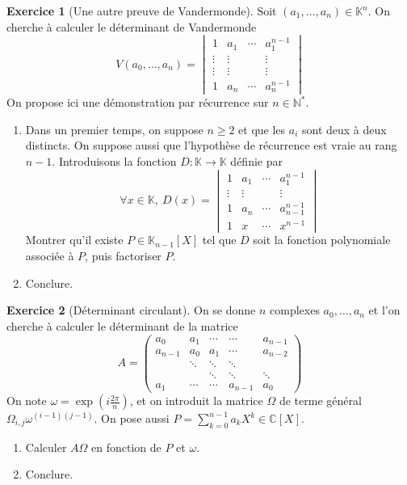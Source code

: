 \documentclass[french]{book}
\newcommand{\N}{\mathbb{N}}
\newcommand{\C}{\mathbb{C}}
\newcommand{\K}{\mathbb{K}}
\newcommand{\st}{^*}
\theoremstyle{definition}
\newtheorem{ex}{Exercice}[chapter]
\theoremstyle{theorem}
\theoremstyle{remark}
\begin{document}
\begin{ex}[Une autre preuve de Vandermonde]
	Soit $(a_1,\ldots,a_n)\in\K^{n}$. On cherche à calculer le déterminant de Vandermonde $$V(a_0,\ldots,a_n)=\begin{vmatrix}
		1&a_1&\cdots&a_1^{n-1}\\
		\vdots&\vdots&&\vdots\\
		\vdots&\vdots&&\vdots\\
		1&a_n&\cdots&a_n^{n-1}
	\end{vmatrix}$$ On propose ici une démonstration par récurrence sur $n\in\N\st$.
	\begin{enumerate}
		\item Dans un premier temps, on suppose $n\geqslant 2$ et que les $a_i$ sont deux à deux distincts. On suppose aussi que l'hypothèse de récurrence est vraie au rang $n-1$. Introduisons la fonction $D:\K\to\K$ définie par $$\forall x\in\K,\ D(x)=\begin{vmatrix}
			1&a_1&\cdots&a_1^{n-1}\\
			\vdots&\vdots&&\vdots\\
			1&a_n&\cdots&a_{n-1}^{n-1}\\
			1&x&\cdots&x^{n-1}
		\end{vmatrix}$$ Montrer qu'il existe $P\in\K_{n-1}[X]$ tel que $D$ soit la fonction polynomiale associée à $P$, puis factoriser $P$.
		\item Conclure.
	\end{enumerate}
\end{ex}

\begin{ex}[Déterminant circulant]
	On se donne $n$ complexes $a_0,\ldots,a_n$ et l'on cherche à calculer le déterminant de la matrice $$A=\begin{pmatrix}
		a_0&a_1&\cdots&\cdots&a_{n-1}\\
		a_{n-1}&a_0&a_1&\cdots&a_{n-2}\\
		&\ddots&\ddots&\ddots&\\
		&&\ddots&\ddots&\ddots\\
		a_1&\cdots&\cdots&a_{n-1}&a_0
	\end{pmatrix} $$ On note $\omega=\exp\displaystyle\left(i\frac{2\pi}{n}\right)$, et on introduit la matrice $\Omega$ de terme général $\Omega_{i,j}\omega^{(i-1)(j-1)}$. On pose aussi $P=\displaystyle\sum_{k=0}^{n-1}a_kX^k\in\C[X]$.
	\begin{enumerate}
		\item Calculer $A\Omega$ en fonction de $P$ et $\omega$.
		\item Conclure.
	\end{enumerate} 
\end{ex}
\end{document}
